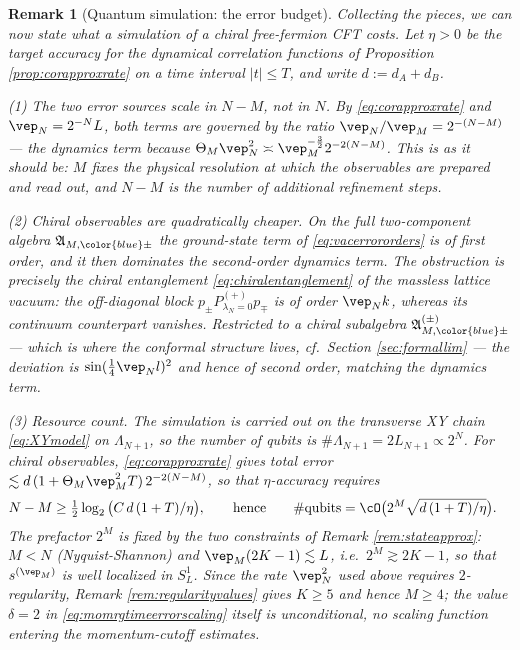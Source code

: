 \documentclass[a4paper, 11pt]{article}
\newcommand{\fA}{\mathfrak{A}}\newcommand{\cA}{\mathcal{A}}\newcommand{\dA}{\mathds{A}}\newcommand{\sA}{\mathscr{A}}
\DeclareMathOperator{\1}{\mathds{1}}
\newtheorem{rem}[thm]{Remark}
\begin{document}
\begin{rem}[Quantum simulation: the error budget]
\label{rem:simulationbudget}
Collecting the pieces, we can now state what a simulation of a chiral free-fermion CFT costs. Let $\eta>0$ be the target accuracy for the dynamical correlation functions of Proposition \ref{prop:corapproxrate} on a time interval $|t|\leq T$, and write $d:=d_{A}+d_{B}$.

\emph{(1) The two error sources scale in $N-M$, not in $N$.} By \eqref{eq:corapproxrate} and $\vep_{N}=2^{-N}L$, both terms are governed by the ratio $\vep_{N}/\vep_{M}=2^{-(N-M)}$ --- the dynamics term because $\Theta_{M}\vep_{N}^{2}\asymp\vep_{M}^{-\frac{3}{2}}2^{-2(N-M)}$. This is as it should be: $M$ fixes the physical resolution at which the observables are prepared and read out, and $N-M$ is the number of additional refinement steps.

\emph{(2) Chiral observables are quadratically cheaper.} On the full two-component algebra $\fA_{M,{\color{blue}\pm}}$ the ground-state term of \eqref{eq:vacerrororders} is of \emph{first} order, and it then dominates the second-order dynamics term. The obstruction is precisely the chiral entanglement \eqref{eq:chiralentanglement} of the massless lattice vacuum: the off-diagonal block $p_{\pm}P^{(+)}_{\lambda_{N}=0}p_{\mp}$ is of order $\vep_{N}k$, whereas its continuum counterpart vanishes. Restricted to a chiral subalgebra $\fA^{(\pm)}_{M,{\color{blue}\pm}}$ --- which is where the conformal structure lives, cf.~Section \ref{sec:formallim} --- the deviation is $\sin(\tfrac{1}{4}\vep_{N}l)^{2}$ and hence of \emph{second} order, matching the dynamics term.

\emph{(3) Resource count.} The simulation is carried out on the transverse XY chain \eqref{eq:XYmodel} on $\Lambda_{N+1}$, so the number of qubits is $\#\Lambda_{N+1}=2L_{N+1}\propto2^{N}$. For chiral observables, \eqref{eq:corapproxrate} gives total error $\lesssim d\!\ (1+\Theta_{M}\vep_{M}^{2}T)\!\ 2^{-2(N-M)}$, so that $\eta$-accuracy requires
\begin{align}
\label{eq:qubitcount}
N-M & \geq \tfrac{1}{2}\log_{2}\big(C\!\ d\!\ (1+T)/\eta\big), \qquad\textup{hence}\qquad \#\textup{qubits} = \cO\big(2^{M}\sqrt{d\!\ (1+T)/\eta}\big).
\end{align}
The prefactor $2^{M}$ is fixed by the two constraints of Remark \ref{rem:stateapprox}: $M<N$ (Nyquist-Shannon) and $\vep_{M}(2K-1)\lesssim L$, i.e.~$2^{M}\gtrsim2K-1$, so that $s^{(\vep_{M})}$ is well localized in $S^{1}_{L}$. Since the rate $\vep_{N}^{2}$ used above requires $2$-regularity, Remark \ref{rem:regularityvalues} gives $K\geq5$ and hence $M\geq4$; the value $\delta=2$ in \eqref{eq:momrgtimeerrorscaling} itself is unconditional, no scaling function entering the momentum-cutoff estimates.


\end{rem}
\end{document}
